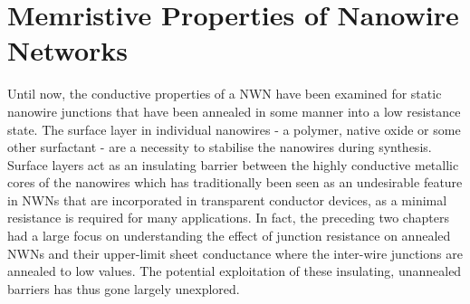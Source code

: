 \chapter{Memristive Properties of Nanowire Networks}
Until now, the conductive properties of a NWN have been examined for static nanowire junctions that have been annealed in some manner into a low resistance state. The surface layer in individual nanowires - a polymer, native oxide or some other surfactant - are a necessity to stabilise the nanowires during synthesis\cite{shah2004}. Surface layers act as an insulating barrier between the highly conductive metallic cores of the nanowires which has traditionally been seen as an undesirable feature in NWNs that are incorporated in transparent conductor devices, as a minimal resistance is required for many applications\cite{mutiso2013}. In fact, the preceding two chapters had a large focus on understanding the effect of junction resistance on annealed NWNs and their upper-limit sheet conductance where the inter-wire junctions are annealed to low values. The potential exploitation of these insulating, unannealed barriers has thus gone largely unexplored.


